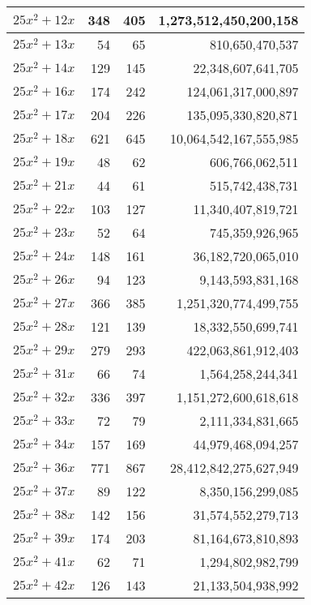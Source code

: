 \documentclass[a4paper]{amsproc}
\theoremstyle{plain}
\theoremstyle{named}
\begin{document}
\begin{longtable}{ | l | r | r | r | }
$25x^2 + 12x$ & 348 & 405 & 1{,}273{,}512{,}450{,}200{,}158 \\ \hline
$25x^2 + 13x$ & 54 & 65 & 810{,}650{,}470{,}537 \\ \hline
$25x^2 + 14x$ & 129 & 145 & 22{,}348{,}607{,}641{,}705 \\ \hline
$25x^2 + 16x$ & 174 & 242 & 124{,}061{,}317{,}000{,}897 \\ \hline
$25x^2 + 17x$ & 204 & 226 & 135{,}095{,}330{,}820{,}871 \\ \hline
$25x^2 + 18x$ & 621 & 645 & 10{,}064{,}542{,}167{,}555{,}985 \\ \hline
$25x^2 + 19x$ & 48 & 62 & 606{,}766{,}062{,}511 \\ \hline
$25x^2 + 21x$ & 44 & 61 & 515{,}742{,}438{,}731 \\ \hline
$25x^2 + 22x$ & 103 & 127 & 11{,}340{,}407{,}819{,}721 \\ \hline
$25x^2 + 23x$ & 52 & 64 & 745{,}359{,}926{,}965 \\ \hline
$25x^2 + 24x$ & 148 & 161 & 36{,}182{,}720{,}065{,}010 \\ \hline
$25x^2 + 26x$ & 94 & 123 & 9{,}143{,}593{,}831{,}168 \\ \hline
$25x^2 + 27x$ & 366 & 385 & 1{,}251{,}320{,}774{,}499{,}755 \\ \hline
$25x^2 + 28x$ & 121 & 139 & 18{,}332{,}550{,}699{,}741 \\ \hline
$25x^2 + 29x$ & 279 & 293 & 422{,}063{,}861{,}912{,}403 \\ \hline
$25x^2 + 31x$ & 66 & 74 & 1{,}564{,}258{,}244{,}341 \\ \hline
$25x^2 + 32x$ & 336 & 397 & 1{,}151{,}272{,}600{,}618{,}618 \\ \hline
$25x^2 + 33x$ & 72 & 79 & 2{,}111{,}334{,}831{,}665 \\ \hline
$25x^2 + 34x$ & 157 & 169 & 44{,}979{,}468{,}094{,}257 \\ \hline
$25x^2 + 36x$ & 771 & 867 & 28{,}412{,}842{,}275{,}627{,}949 \\ \hline
$25x^2 + 37x$ & 89 & 122 & 8{,}350{,}156{,}299{,}085 \\ \hline
$25x^2 + 38x$ & 142 & 156 & 31{,}574{,}552{,}279{,}713 \\ \hline
$25x^2 + 39x$ & 174 & 203 & 81{,}164{,}673{,}810{,}893 \\ \hline
$25x^2 + 41x$ & 62 & 71 & 1{,}294{,}802{,}982{,}799 \\ \hline
$25x^2 + 42x$ & 126 & 143 & 21{,}133{,}504{,}938{,}992 \\ \hline

\end{longtable}
\end{document}
